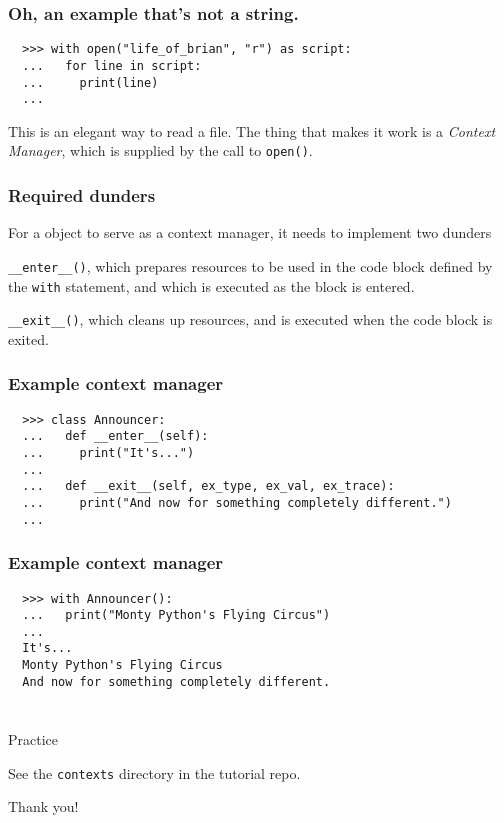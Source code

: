 \documentclass[aspectratio=169]{beamer}
\begin{document}
\begin{frame}[fragile]
  \frametitle{Oh, an example that's not a string.}
  
  \begin{verbatim}
  >>> with open("life_of_brian", "r") as script:
  ...   for line in script:
  ...     print(line)
  ...  
  \end{verbatim}
  
  \bigbreak 
  This is an elegant way to read a file. The thing that makes it work is a \emph{Context Manager},
  which is supplied by the call to \texttt{open()}.
  
  \end{frame}
\begin{frame}[fragile]
  \frametitle{Required dunders}
  
  For a object to serve as a context manager, it needs to implement two dunders
  
  \bigbreak
  \texttt{\_\_enter\_\_()}, which prepares resources to be used in the code block defined by the \texttt{with} statement,
  and which is executed as the block is entered.
  
  \bigbreak
  \texttt{\_\_exit\_\_()}, which cleans up resources, and is executed when the code block is exited.

  \end{frame}
 
\begin{frame}[fragile]
  \frametitle{Example context manager}
  
  \begin{verbatim}
  >>> class Announcer:
  ...   def __enter__(self):
  ...     print("It's...")
  ...
  ...   def __exit__(self, ex_type, ex_val, ex_trace):
  ...     print("And now for something completely different.")
  ...
  \end{verbatim}
  
    
  \end{frame}

\begin{frame}[fragile]
  \frametitle{Example context manager}
  
  \begin{verbatim}
  >>> with Announcer():
  ...   print("Monty Python's Flying Circus")
  ...
  It's...
  Monty Python's Flying Circus
  And now for something completely different.  
  
  \end{verbatim}
  
    
  \end{frame}
 
\begin{frame}
  \frametitle{} 
   
   \centerline{\huge Practice} 
   \centerline{See the \texttt{contexts} directory in the tutorial repo.} 
   
   \bigbreak
   \centerline{\huge Thank you!} 
   \end{frame}
\end{document}
